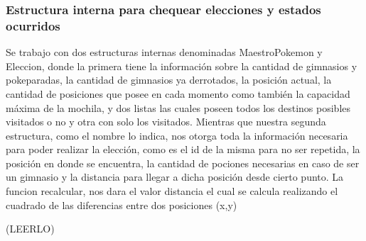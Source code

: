 \subsubsection{Estructura interna para chequear elecciones y estados ocurridos}

Se trabajo con dos estructuras internas denominadas MaestroPokemon y Eleccion, donde la primera tiene la informaci\'on sobre la cantidad de gimnasios y pokeparadas, la cantidad de gimnasios ya derrotados, la posici\'on actual, la cantidad de posiciones que posee en cada momento como tambi\'en la capacidad m\'axima de la mochila, y dos listas las cuales poseen todos los destinos posibles visitados o no y otra con solo los visitados.
Mientras que nuestra segunda estructura, como el nombre lo indica, nos otorga toda la informaci\'on necesaria para poder realizar la elecci\'on, como es el id de la misma para no ser repetida, la posici\'on en donde se encuentra, la cantidad de pociones necesarias en caso de ser un gimnasio y la distancia para llegar a dicha posici\'on desde cierto punto.
La funcion recalcular, nos dara el valor distancia el cual se calcula realizando el cuadrado de las diferencias entre dos posiciones (x,y)

(LEERLO)

